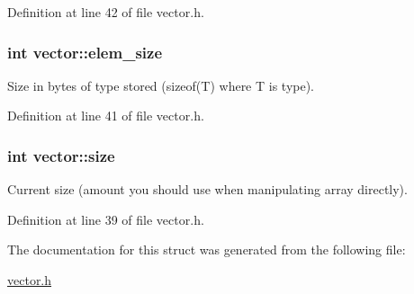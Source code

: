 Definition at line 42 of file vector.h.

\hypertarget{structvector_a1e2d06aaea690d5420fc153fa9b8c2b8}{
\subsubsection[{elem\_\-size}]{\setlength{\rightskip}{0pt plus 5cm}int {\bf vector::elem\_\-size}}}
\label{structvector_a1e2d06aaea690d5420fc153fa9b8c2b8}


Size in bytes of type stored (sizeof(T) where T is type). 



Definition at line 41 of file vector.h.

\hypertarget{structvector_a211c6f9096b87e1ff8b09ad5ad373e61}{
\subsubsection[{size}]{\setlength{\rightskip}{0pt plus 5cm}int {\bf vector::size}}}
\label{structvector_a211c6f9096b87e1ff8b09ad5ad373e61}


Current size (amount you should use when manipulating array directly). 



Definition at line 39 of file vector.h.



The documentation for this struct was generated from the following file:\begin{DoxyCompactItemize}
\item 
\hyperlink{vector_8h}{vector.h}\end{DoxyCompactItemize}
